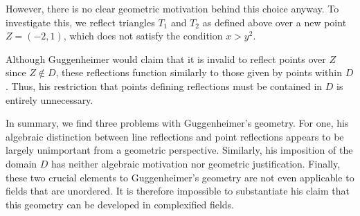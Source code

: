 \documentclass[12pt]{article}
\theoremstyle{plain}
\theoremstyle{definition}
\begin{document}
However, there is no clear geometric motivation behind this choice anyway. To investigate this, we reflect triangles $T_1$ and $T_2$ as defined above over a new point $Z = (-2, 1)$, which does not satisfy the condition $x > y^2$. 

Although Guggenheimer would claim that it is invalid to reflect points over $Z$ since $Z \notin D$, these reflections function similarly to those given by points within $D$. Thus, his restriction that points defining reflections must be contained in $D$ is entirely unnecessary. 

In summary, we find three problems with Guggenheimer's geometry. For one, his algebraic distinction between line reflections and point reflections appears to be largely unimportant from a geometric perspective. Similarly, his imposition of the domain $D$ has neither algebraic motivation nor geometric justification. Finally, these two crucial elements to Guggenheimer's geometry are not even applicable to fields that are unordered. It is therefore impossible to substantiate his claim that this geometry can be developed in complexified fields.
\end{document}
